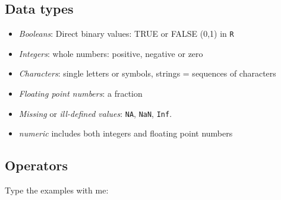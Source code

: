 \documentclass[
]{gitbook}
\providecommand{\tightlist}{%
  \setlength{\itemsep}{0pt}\setlength{\parskip}{0pt}}
\begin{document}
\hypertarget{data-types}{%
\subsection{Data types}\label{data-types}}

\begin{itemize}
\tightlist
\item
  \emph{Booleans}: Direct binary values: TRUE or FALSE (0,1) in \texttt{R}
\item
  \emph{Integers}: whole numbers: positive, negative or zero
\item
  \emph{Characters}: single letters or symbols, strings = sequences of characters
\item
  \emph{Floating point numbers}: a fraction
\item
  \emph{Missing} or \emph{ill-defined values}: \texttt{NA}, \texttt{NaN}, \texttt{Inf}.
\item
  \emph{numeric} includes both integers and floating point numbers
\end{itemize}

\newpage

\hypertarget{operators}{%
\subsection{Operators}\label{operators}}

Type the examples with me:
\end{document}
